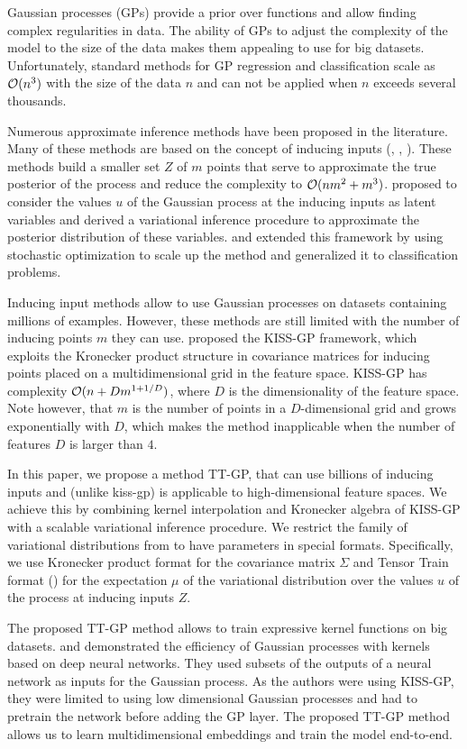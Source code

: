 Gaussian processes (GPs) provide a prior over functions and allow finding complex
regularities in data. The ability of GPs to adjust the complexity of the model
to the size of the data makes them appealing to use for big datasets.
Unfortunately, standard methods for GP regression and classification scale as
$\mathcal{O}(n^3)$ with the size of the data $n$ and can not be applied when $n$
exceeds several thousands.

Numerous approximate inference methods have been proposed in the literature. Many
of these methods are based on the concept of inducing inputs (\citet{candela2005},
\citet{snelson2006}, \citet{williams2000}). These methods build a smaller set
$Z$ of $m$ points that serve to approximate the true posterior of the process
and reduce the complexity to $\mathcal{O}(nm^2 + m^3)$. \citet{titsias2009} proposed
to consider the values $u$ of the Gaussian process at the inducing inputs
as latent variables and derived a variational inference procedure to approximate
the posterior distribution of these variables. \citet{hensman2013} and
\citet{hensman2015} extended this framework by using stochastic optimization to
scale up the method and generalized it to classification problems.

Inducing input methods allow to use Gaussian processes on datasets containing
millions of examples. However, these methods are still limited with the number
of inducing points $m$ they can use. \citet{wilson2015} proposed the KISS-GP
framework, which exploits the Kronecker product structure in covariance matrices
for inducing points placed on a multidimensional grid in the feature space.
KISS-GP has complexity $\mathcal{O}(n + D m^{1 + 1/D})$, where $D$ is the dimensionality
of the feature space. Note however, that $m$ is the number of points in a
$D$-dimensional grid and grows exponentially with $D$, which makes the method
inapplicable when the number of features $D$ is larger than $4$.

In this paper, we propose a method TT-GP, that can use billions of inducing
inputs and (unlike kiss-gp) is applicable to high-dimensional feature spaces.
We achieve this by combining kernel interpolation and Kronecker algebra of KISS-GP with
a scalable variational inference procedure. We restrict the family of
variational distributions from \citet{hensman2013} to have parameters in
special formats. Specifically, we use Kronecker product format for the
covariance matrix $\Sigma$ and Tensor Train format (\citet{oseledets2011}) for the
expectation $\mu$ of the variational distribution over the values $u$ of the
process at inducing inputs $Z$.

The proposed TT-GP method allows to train expressive kernel functions
on big datasets. \citet{wilson2016deep} and \citet{wilson2016stochastic}
demonstrated the efficiency of Gaussian processes with kernels based on deep
neural networks. They used subsets of the outputs of a neural network as
inputs for the Gaussian process. As the authors were using KISS-GP, they
were limited to using low dimensional Gaussian processes and had to
pretrain the network before adding the GP layer. The proposed TT-GP method
allows us to learn multidimensional embeddings and train the model end-to-end.
